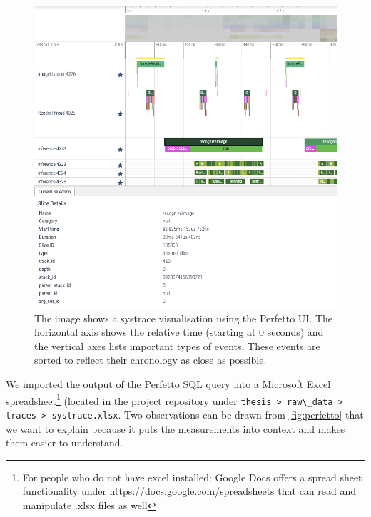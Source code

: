 \documentclass[
			   fontsize=11pt,
               paper=a4,
               bibliography=totoc,
               idxtotoc,
               headsepline,
               footsepline,
               footinclude=false,
               BCOR=12mm,
               DIV=13,
               openany,   %
               ]
               {scrbook}
\newcommand{\code}[1]{\lstinline[basicstyle = \ttfamily\small]{#1}} %
\begin{document}
\begin{figure}[h] %
	\centering
	\includegraphics[width=.97\textwidth]{figures/perfetto_visualisation.png}
	\caption[Screenshot of Visual Systrace Analysis With Perfetto UI]{The image shows a systrace visualisation using the Perfetto UI. The horizontal axis shows the relative time (starting at 0 seconds) and the vertical axes lists important types of events. These events are sorted to reflect their chronology as close as possible.}
	\label{fig:perfetto}
\end{figure}

\newpage

We imported the output of the Perfetto SQL query into a Microsoft Excel spreadsheet\footnote{For people who do not have excel installed: Google Docs offers a spread sheet functionality under \url{https://docs.google.com/spreadsheets} that can read and manipulate .xlsx files as well} (located in the project repository under \code{thesis > raw\_data > traces > systrace.xlsx}. Two observations can be drawn from \autoref{fig:perfetto} that we want to explain because it puts the measurements into context and makes them easier to understand. \\
\end{document}
